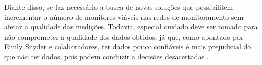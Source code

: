 Diante disso, se faz necessário a busca de novas soluções que possibilitem incrementar o número de monitores viáveis nas redes de monitoramento sem afetar a qualidade das medições. Todavia, especial cuidado deve ser tomado para não comprometer a qualidade dos dados obtidos, já que, como apontado por Emily Snyder e colaboradores, ter dados pouco confiáveis é mais prejudicial do que não ter dados, pois podem conduzir a decisões desacertadas \cite{Snyder2013}.